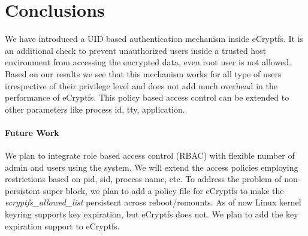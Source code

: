 \section{Conclusions}
\label{conc}

%
%
%

We have introduced a UID based authentication mechanism inside
eCryptfs.  It is an additional check to prevent unauthorized users
inside a trusted host environment from accessing the encrypted data,
even root user is not allowed.  Based on our results we see that this
mechanism works for all type of users irrespective of their privilege
level and does not add much overhead in the performance of eCryptfs.
This policy based access control can be extended to other parameters
like process id, tty, application.

\paragraph{Future Work}
We plan to integrate role based access control (RBAC) with flexible
number of admin and users using the system.  We will extend the access
policies employing restrictions based on pid, sid, process name, etc.
To address the problem of non-persistent super block, we plan to add a
policy file for eCryptfs to make the \emph{ecryptfs\_allowed\_list}
persistent across reboot/remounts.  As of now Linux kernel keyring
supports key expiration, but eCryptfs does not.  We plan to add the
key expiration support to eCryptfs.

%
%
%
%
%
%
%

